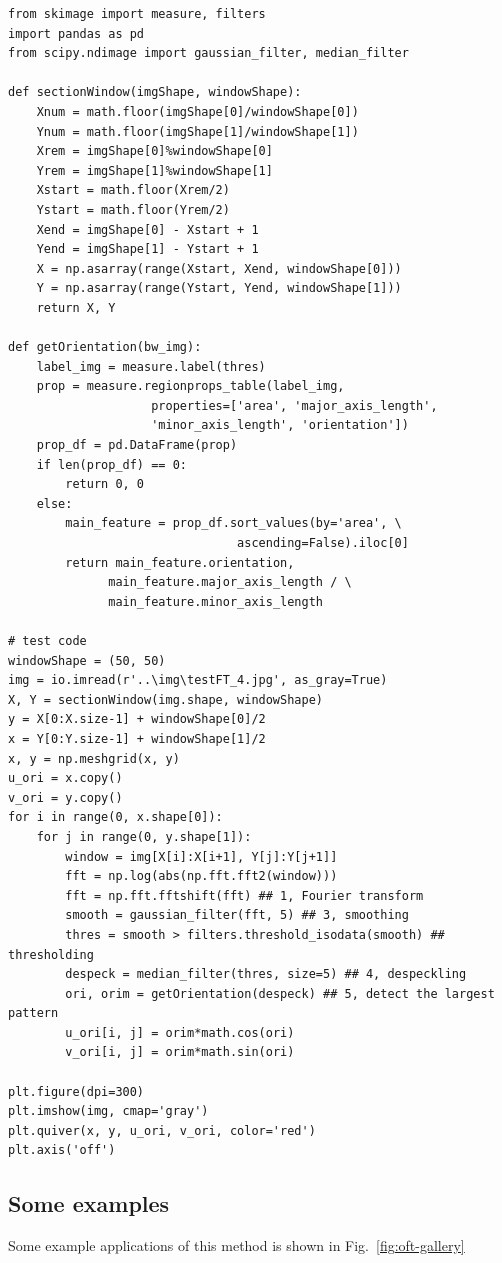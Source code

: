 \begin{verbatim}
from skimage import measure, filters
import pandas as pd
from scipy.ndimage import gaussian_filter, median_filter

def sectionWindow(imgShape, windowShape):
    Xnum = math.floor(imgShape[0]/windowShape[0])
    Ynum = math.floor(imgShape[1]/windowShape[1])
    Xrem = imgShape[0]%windowShape[0]
    Yrem = imgShape[1]%windowShape[1]
    Xstart = math.floor(Xrem/2)
    Ystart = math.floor(Yrem/2)
    Xend = imgShape[0] - Xstart + 1
    Yend = imgShape[1] - Ystart + 1
    X = np.asarray(range(Xstart, Xend, windowShape[0]))
    Y = np.asarray(range(Ystart, Yend, windowShape[1]))
    return X, Y

def getOrientation(bw_img):
    label_img = measure.label(thres)
    prop = measure.regionprops_table(label_img,
                    properties=['area', 'major_axis_length',
                    'minor_axis_length', 'orientation'])
    prop_df = pd.DataFrame(prop)
    if len(prop_df) == 0:
        return 0, 0
    else:
        main_feature = prop_df.sort_values(by='area', \
                                ascending=False).iloc[0]
        return main_feature.orientation,
              main_feature.major_axis_length / \
              main_feature.minor_axis_length

# test code
windowShape = (50, 50)
img = io.imread(r'..\img\testFT_4.jpg', as_gray=True)
X, Y = sectionWindow(img.shape, windowShape)
y = X[0:X.size-1] + windowShape[0]/2
x = Y[0:Y.size-1] + windowShape[1]/2
x, y = np.meshgrid(x, y)
u_ori = x.copy()
v_ori = y.copy()
for i in range(0, x.shape[0]):
    for j in range(0, y.shape[1]):
        window = img[X[i]:X[i+1], Y[j]:Y[j+1]]
        fft = np.log(abs(np.fft.fft2(window)))
        fft = np.fft.fftshift(fft) ## 1, Fourier transform
        smooth = gaussian_filter(fft, 5) ## 3, smoothing
        thres = smooth > filters.threshold_isodata(smooth) ## thresholding
        despeck = median_filter(thres, size=5) ## 4, despeckling
        ori, orim = getOrientation(despeck) ## 5, detect the largest pattern
        u_ori[i, j] = orim*math.cos(ori)
        v_ori[i, j] = orim*math.sin(ori)

plt.figure(dpi=300)
plt.imshow(img, cmap='gray')
plt.quiver(x, y, u_ori, v_ori, color='red')
plt.axis('off')
\end{verbatim}

\subsection{Some examples}
\label{sec:oft-gallery}
Some example applications of this method is shown in Fig.~\ref{fig:oft-gallery}

